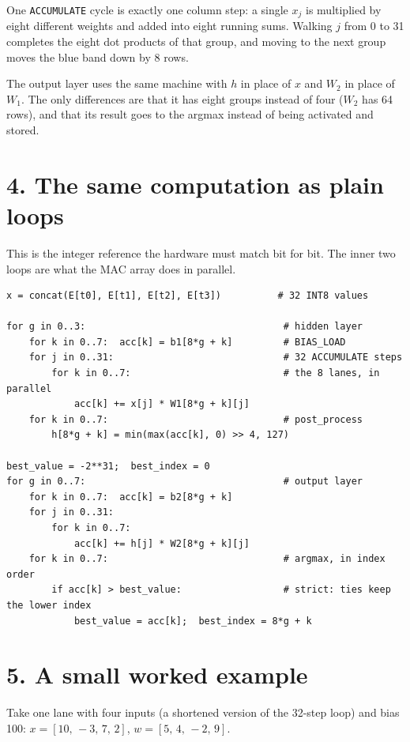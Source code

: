 \documentclass[10pt,a4paper]{article}
\begin{document}
One \texttt{ACCUMULATE} cycle is exactly one column step: a single $x_j$ is multiplied by eight different weights and added into eight running sums. Walking $j$ from 0 to 31 completes the eight dot products of that group, and moving to the next group moves the blue band down by 8 rows.

The output layer uses the same machine with $h$ in place of $x$ and $W_2$ in place of $W_1$. The only differences are that it has eight groups instead of four ($W_2$ has 64 rows), and that its result goes to the argmax instead of being activated and stored.

\section*{4. The same computation as plain loops}

This is the integer reference the hardware must match bit for bit. The inner two loops are what the MAC array does in parallel.

\begin{verbatim}
x = concat(E[t0], E[t1], E[t2], E[t3])          # 32 INT8 values

for g in 0..3:                                   # hidden layer
    for k in 0..7:  acc[k] = b1[8*g + k]         # BIAS_LOAD
    for j in 0..31:                              # 32 ACCUMULATE steps
        for k in 0..7:                           # the 8 lanes, in parallel
            acc[k] += x[j] * W1[8*g + k][j]
    for k in 0..7:                               # post_process
        h[8*g + k] = min(max(acc[k], 0) >> 4, 127)

best_value = -2**31;  best_index = 0
for g in 0..7:                                   # output layer
    for k in 0..7:  acc[k] = b2[8*g + k]
    for j in 0..31:
        for k in 0..7:
            acc[k] += h[j] * W2[8*g + k][j]
    for k in 0..7:                               # argmax, in index order
        if acc[k] > best_value:                  # strict: ties keep the lower index
            best_value = acc[k];  best_index = 8*g + k
\end{verbatim}

\section*{5. A small worked example}

Take one lane with four inputs (a shortened version of the 32-step loop) and bias 100:
$x=[10,\,-3,\,7,\,2]$, $w=[5,\,4,\,-2,\,9]$.
\end{document}
